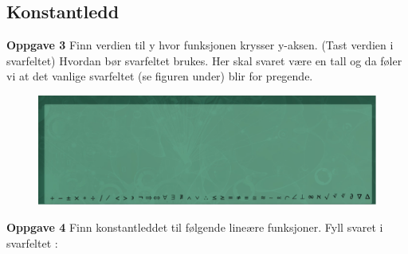 \documentclass[12pt,twoside,onecolumn]{article}
\begin{document}
\subsection*{Konstantledd}

\textbf{Oppgave 3} \newline
Finn verdien til y hvor funksjonen krysser y-aksen. (Tast verdien i svarfeltet) {\color{Cerulean} Hvordan bør svarfeltet brukes. Her skal svaret være en tall og da føler vi at det vanlige svarfeltet (se figuren under) blir for pregende.}

\begin{figure}[h!]
\centering
\includegraphics[scale = 0.3]{figures/Svarfelt.png}
\label{fig:grid}
\end{figure}

\hspace{-6mm}\textbf{Oppgave 4} \newline
Finn konstantleddet til følgende lineære funksjoner. Fyll svaret i svarfeltet :
\end{document}
